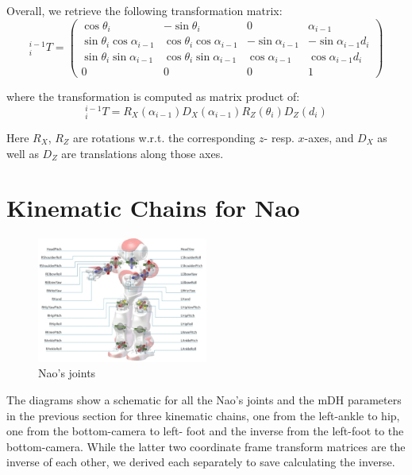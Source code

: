 \documentclass[pdftex,11pt,a4paper]{report}
\begin{document}
Overall, we retrieve the following transformation matrix:
\begin{equation}
^{i-1}_iT=\left(
\begin{array}{cccc}
\cos \theta_i&-\sin \theta_i&0&\alpha_{i-1}\\
\sin \theta_i \cos \alpha_{i-1}&\cos \theta_i \cos \alpha_{i-1}&-\sin \alpha_{i-1} &-\sin \alpha_{i-1} d_i\\
\sin \theta_i \sin \alpha_{i-1}&\cos \theta_i \sin \alpha_{i-1}&\cos \alpha_{i-1} &\cos \alpha_{i-1} d_i\\
0&0&0&1
\end{array}
\right)
\end{equation}

where the transformation is computed as matrix product of:
$$^{i-1}_iT=R_X(\alpha_{i-1})D_X(\alpha_{i-1})R_Z(\theta_i)D_Z(d_i)$$

Here $R_X$, $R_Z$ are rotations w.r.t. the corresponding $z$- resp. $x$-axes, and $D_X$ as well as $D_Z$ are translations along those axes.

\section{Kinematic Chains for Nao}\label{appendixNaoKinematicChains}

\begin{figure}[ht]
\centering
\includegraphics[width=0.5\textwidth]{figures/naoJoints}
\caption{Nao's joints} \label{figNaoJoints}
\end{figure}

The diagrams show a schematic for all the Nao's joints and the mDH parameters in the previous section for three kinematic chains, one from the left-ankle to hip, one from the bottom-camera to left- foot and the inverse from the left-foot to the bottom-camera. While the latter two coordinate frame transform matrices are the inverse of each other, we derived each separately to save calculating the inverse.  
\end{document}

